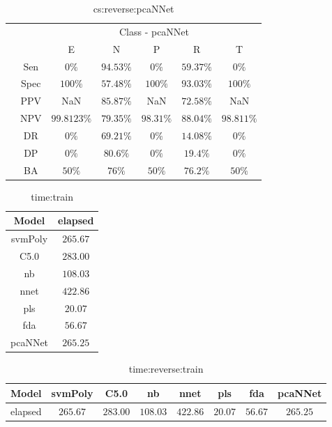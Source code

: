 \begin{table}[!ht]
	\centering
	\begin{tabular}{|c|c|c|c|c|c|c|}
		\cline{3-7}
		\multicolumn{2}{c|}{} & \multicolumn{5}{c|}{Class - pcaNNet} \\ \cline{3-7}
		\multicolumn{2}{c|}{} & E & N & P & R & T \\ \hline
		\multirow{7}{*}{\rotatebox{90}{Statistics}} & Sen & $0\%$ & $94.53\%$ & $0\%$ & $59.37\%$ & $0\%$ \\ \cline{2-7}
		 & Spec & $100\%$ & $57.48\%$ & $100\%$ & $93.03\%$ & $100\%$ \\ \cline{2-7}
		 & PPV & NaN & $85.87\%$ & NaN & $72.58\%$ & NaN \\ \cline{2-7}
		 & NPV & $99.8123\%$ & $79.35\%$ & $98.31\%$ & $88.04\%$ & $98.811\%$ \\ \cline{2-7}
		 & DR & $0\%$ & $69.21\%$ & $0\%$ & $14.08\%$ & $0\%$ \\ \cline{2-7}
		 & DP & $0\%$ & $80.6\%$ & $0\%$ & $19.4\%$ & $0\%$ \\ \cline{2-7}
		 & BA & $50\%$ & $76\%$ & $50\%$ & $76.2\%$ & $50\%$ \\ \hline
	\end{tabular}
	\caption{cs:reverse:pcaNNet}
	\label{tab:cs:reverse:pcaNNet}
\end{table}

\begin{table}[!ht]
	\centering
	\begin{tabular}{|c|c|}
		\hline
		Model & elapsed \\ \hline
		svmPoly & $265.67$ \\ \hline
		C5.0 & $283.00$ \\ \hline
		nb & $108.03$ \\ \hline
		nnet & $422.86$ \\ \hline
		pls & $20.07$ \\ \hline
		fda & $56.67$ \\ \hline
		pcaNNet & $265.25$ \\ \hline
	\end{tabular}
	\caption{time:train}
	\label{tab:time:train}
\end{table}

\begin{table}[!ht]
	\centering
	\begin{tabular}{|c|c|c|c|c|c|c|c|}
		\hline
		Model & svmPoly & C5.0 & nb & nnet & pls & fda & pcaNNet \\ \hline
		elapsed & $265.67$ & $283.00$ & $108.03$ & $422.86$ & $20.07$ & $56.67$ & $265.25$ \\ \hline
	\end{tabular}
	\caption{time:reverse:train}
	\label{tab:time:reverse:train}
\end{table}

